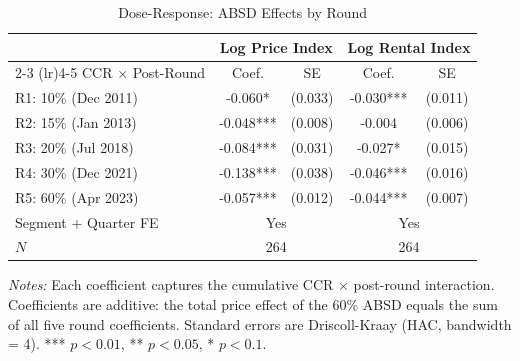 \begin{table}[htbp]
\centering
\caption{Dose-Response: ABSD Effects by Round}\label{tab:dose}
\begin{threeparttable}
\begin{tabular}{lcccc}
\toprule
 & \multicolumn{2}{c}{Log Price Index} & \multicolumn{2}{c}{Log Rental Index} \\
\cmidrule(lr){2-3} \cmidrule(lr){4-5}
CCR $\times$ Post-Round & Coef. & SE & Coef. & SE \\
\midrule
R1: 10\% (Dec 2011) & -0.060* & (0.033) & -0.030*** & (0.011) \\
R2: 15\% (Jan 2013) & -0.048*** & (0.008) & -0.004 & (0.006) \\
R3: 20\% (Jul 2018) & -0.084*** & (0.031) & -0.027* & (0.015) \\
R4: 30\% (Dec 2021) & -0.138*** & (0.038) & -0.046*** & (0.016) \\
R5: 60\% (Apr 2023) & -0.057*** & (0.012) & -0.044*** & (0.007) \\
\midrule
Segment + Quarter FE & \multicolumn{2}{c}{Yes} & \multicolumn{2}{c}{Yes} \\
$N$ & \multicolumn{2}{c}{264} & \multicolumn{2}{c}{264} \\
\bottomrule
\end{tabular}
\begin{tablenotes}[flushleft]\small
\item \textit{Notes:} Each coefficient captures the cumulative CCR $\times$ post-round interaction. Coefficients are additive: the total price effect of the 60\% ABSD equals the sum of all five round coefficients. Standard errors are Driscoll-Kraay (HAC, bandwidth = 4). *** $p<0.01$, ** $p<0.05$, * $p<0.1$.
\end{tablenotes}
\end{threeparttable}
\end{table}

